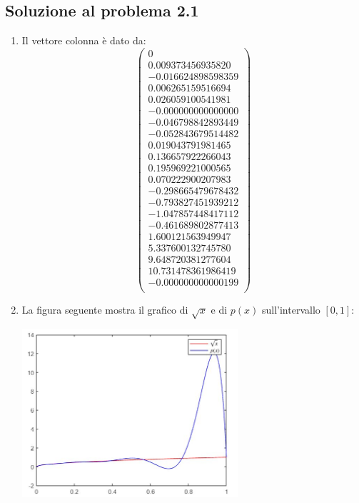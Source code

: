 \documentclass[a4paper,12pt]{article}
\begin{document}
\subsection{Soluzione al problema 2.1}
\begin{enumerate}[label=(\alph*)]

\item Il vettore colonna è dato da:
\begin{equation*}
\begin{pmatrix}
                  0\\
   0.009373456935820\\
  -0.016624898598359\\
   0.006265159516694\\
   0.026059100541981\\
  -0.000000000000000\\
  -0.046798842893449\\
  -0.052843679514482\\
   0.019043791981465\\
   0.136657922266043\\
     0.195969221000565\\
   0.070222900207983\\
  -0.298665479678432\\
  -0.793827451939212\\
  -1.047857448417112\\
  -0.461689802877413\\
   1.600121563949947\\
   5.337600132745780\\
   9.648720381277604\\
  10.731478361986419\\
  -0.000000000000199\\
\end{pmatrix}
\end{equation*}
\item La figura seguente mostra il grafico di $\sqrt{x}$ e di $p(x)$ sull'intervallo $[0, 1]$:
\begin{center}
\includegraphics[width=8cm]{grafico}
\end{center}
\end{enumerate}
\end{document}

